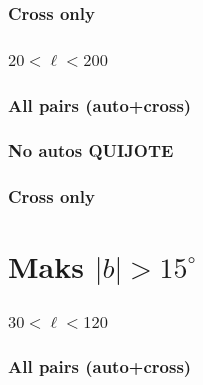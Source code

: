 


\subsubsection*{Cross only}




\clearpage


\subsubsection*{$20 < \ell < 200$}

\subsubsection*{All pairs (auto+cross)}



\subsubsection*{No autos QUIJOTE}





\subsubsection*{Cross only}



\clearpage



\section{Maks $|b| > 15^{\circ}$}

\subsubsection*{$30 < \ell < 120$}

\subsubsection*{All pairs (auto+cross)}

